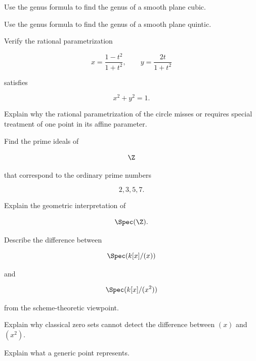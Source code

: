 \begin{exercise}[2]
Use the genus formula to find the genus of a smooth plane cubic.
\end{exercise}

\begin{exercise}[2]
Use the genus formula to find the genus of a smooth plane quintic.
\end{exercise}

\begin{exercise}[3]
Verify the rational parametrization

\[
x=\frac{1-t^2}{1+t^2},
\qquad
y=\frac{2t}{1+t^2}
\]

satisfies

\[
x^2+y^2=1.
\]
\end{exercise}

\begin{exercise}[3]
Explain why the rational parametrization of the circle misses or requires
special treatment of one point in its affine parameter.
\end{exercise}

\begin{exercise}[2]
Find the prime ideals of

\[
\Z
\]

that correspond to the ordinary prime numbers

\[
2,3,5,7.
\]
\end{exercise}

\begin{exercise}[2]
Explain the geometric interpretation of

\[
\Spec(\Z).
\]
\end{exercise}

\begin{exercise}[3]
Describe the difference between

\[
\Spec(k[x]/(x))
\]

and

\[
\Spec(k[x]/(x^2))
\]

from the scheme-theoretic viewpoint.
\end{exercise}

\begin{exercise}[3]
Explain why classical zero sets cannot detect the difference between
\((x)\) and \((x^2)\).
\end{exercise}

\begin{exercise}[3]
Explain what a generic point represents.
\end{exercise}

